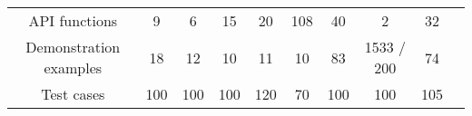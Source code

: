 \begin{table}[]
\begin{adjustbox}{max width=\textwidth}
\begin{tabular}{@{}cccccccccc@{}}
API functions                   & 9                                       & 6                                   & 15                   & 20                   & 108                  & 40                                     & 2                                 & 32                \\
Demonstration examples               & 18                                      & 12                                  & 10                   & 11                   & 10                   & 83                                & 1533 / 200                        & 74                \\
Test cases                   & 100                                     & 100                                 & 100                  & 120                  & 70                   & 100                                    & 100                                & 105                                 \\

\end{tabular}
\end{adjustbox}
\end{table}
